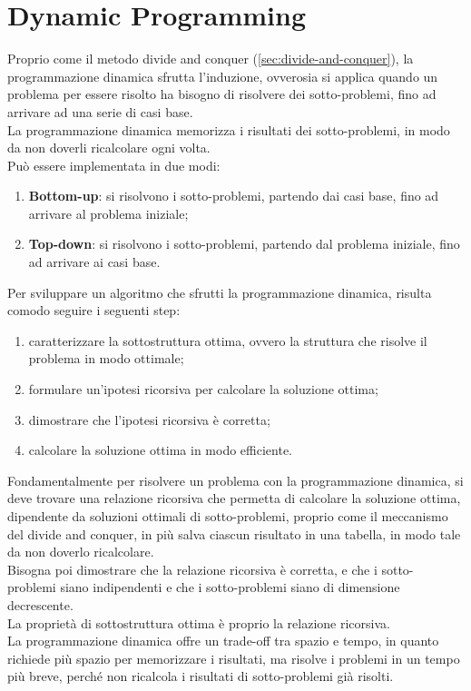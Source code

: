 \documentclass{article}
\begin{document}
\section{Dynamic Programming}
Proprio come il metodo divide and conquer (\ref{sec:divide-and-conquer}), la
programmazione dinamica sfrutta l'induzione, ovverosia si applica quando un
problema per essere risolto ha bisogno di risolvere dei sotto-problemi, fino ad
arrivare ad una serie di casi base.\\
La programmazione dinamica memorizza i risultati dei sotto-problemi, in modo da
non doverli ricalcolare ogni volta.\\
Può essere implementata in due modi:
\begin{enumerate}
	\item \textbf{Bottom-up}: si risolvono i sotto-problemi, partendo dai casi
	      base, fino ad arrivare al problema iniziale;
	\item \textbf{Top-down}: si risolvono i sotto-problemi, partendo dal
	      problema iniziale, fino ad arrivare ai casi base.
\end{enumerate}

Per sviluppare un algoritmo che sfrutti la programmazione dinamica, risulta
comodo seguire i seguenti step:
\begin{enumerate}
	\item caratterizzare la sottostruttura ottima, ovvero la struttura che
	      risolve il problema in modo ottimale;
	\item formulare un'ipotesi ricorsiva per calcolare la soluzione ottima;
	\item dimostrare che l'ipotesi ricorsiva è corretta;
	\item calcolare la soluzione ottima in modo efficiente.
\end{enumerate}

Fondamentalmente per risolvere un problema con la programmazione dinamica, si
deve trovare una relazione ricorsiva che permetta di calcolare la soluzione
ottima, dipendente da soluzioni ottimali di sotto-problemi, proprio come il
meccanismo del divide and conquer, in più salva ciascun risultato in una
tabella, in modo tale da non doverlo ricalcolare.\\
Bisogna poi dimostrare che la relazione ricorsiva è corretta, e che i sotto-
problemi siano indipendenti e che i sotto-problemi siano di dimensione
decrescente.\\
La proprietà di sottostruttura ottima è proprio la relazione ricorsiva.\\
La programmazione dinamica offre un trade-off tra spazio e tempo, in quanto
richiede più spazio per memorizzare i risultati, ma risolve i problemi in un tempo
più breve, perché non ricalcola i risultati di sotto-problemi già risolti.
\end{document}
